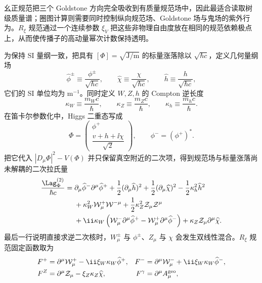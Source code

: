 
幺正规范把三个 Goldstone 方向完全吸收到有质量规范场中，因此最适合读取树级质量谱；圈图计算则需要同时控制纵向规范场、Goldstone 场与鬼场的紫外行为。$R_\xi$ 规范通过一个连续参数 $\xi_V$ 把这些非物理自由度放在相同的规范依赖极点上，从而使传播子的高动量幂次计数保持透明。

为保持 SI 量纲一致，把具有 $[\Phi]=\sqrt{\mathrm{J/m}}$ 的标量涨落除以 $\sqrt{\hbar c}$，定义几何量纲场
\begin{equation*}
 \widehat\phi^\pm\equiv\frac{\phi^\pm}{\sqrt{\hbar c}},
 \qquad
 \widehat\chi\equiv\frac{\chi}{\sqrt{\hbar c}},
 \qquad
 \widehat h\equiv\frac{h}{\sqrt{\hbar c}},
\end{equation*}
它们的 SI 单位均为 $\mathrm{m^{-1}}$。同时定义 $W,Z,h$ 的 Compton 逆长度
\begin{equation*}
 \kappa_W\equiv\frac{m_Wc}{\hbar},
 \qquad
 \kappa_Z\equiv\frac{m_Zc}{\hbar},
 \qquad
 \kappa_h\equiv\frac{m_hc}{\hbar}.
\end{equation*}
在笛卡尔参数化中，Higgs 二重态写成
\begin{equation}
 \Phi=
 \begin{pmatrix}
 \phi^+\\[2pt]
 \dfrac{v+h+\ii\chi}{\sqrt2}
 \end{pmatrix},
 \qquad \phi^-=(\phi^+)^*.
 \label{eq:sm-higgs-cartesian-rxi-dp11}
\end{equation}
把它代入 $|D_\mu\Phi|^2-V(\Phi)$ 并只保留真空附近的二次项，得到规范场与标量涨落尚未解耦的二次拉氏量
\begin{align}
 \frac{\Lag_{\Phi}^{(2)}}{\hbar c}
 ={}&\partial_\mu\widehat\phi^-\partial^\mu\widehat\phi^+
 +\frac12(\partial_\mu\widehat h)^2
 +\frac12(\partial_\mu\widehat\chi)^2
 -\frac12\kappa_h^2\widehat h^2
 \nonumber\\
 &+\kappa_W^2\mathcal W_\mu^+\mathcal W^{-\mu}
 +\frac12\kappa_Z^2\mathcal Z_\mu\mathcal Z^\mu
 \nonumber\\
 &+\ii\kappa_W
 \left(
 \mathcal W^-_\mu\partial^\mu\widehat\phi^+
 -\mathcal W^+_\mu\partial^\mu\widehat\phi^-
 \right)
 +\kappa_Z\mathcal Z_\mu\partial^\mu\widehat\chi.
 \label{eq:sm-rxi-quadratic-before-gf-dp11}
\end{align}
最后一行说明直接求逆二次核时，$W_\mu^\pm$ 与 $\phi^\pm$、$Z_\mu$ 与 $\chi$ 会发生双线性混合。$R_\xi$ 规范固定函数取为
\begin{align}
 F^+&=\partial^\mu\mathcal W_\mu^+
 -\ii\xi_W\kappa_W\widehat\phi^+,
 &F^-&=\partial^\mu\mathcal W_\mu^-
 +\ii\xi_W\kappa_W\widehat\phi^-,\\
 F^Z&=\partial^\mu\mathcal Z_\mu
 -\xi_Z\kappa_Z\widehat\chi,
 &F^\gamma&=\partial^\mu A_\mu^{\rm geo},
 \label{eq:sm-rxi-gauge-functions-dp11}
\end{align}
